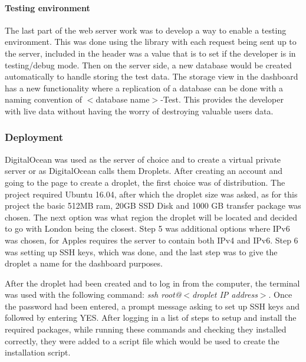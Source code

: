 

\paragraph{Testing environment}

The last part of the web server work was to develop a way to enable a testing environment. This was done using the library with each request being sent up to the server, included in the header was a value that is to set if the developer is in testing/debug mode. Then on the server side, a new database would be created automatically to handle storing the test data. The storage view in the dashboard has a new functionality where a replication of a database can be done with a naming convention of $<$database name$>$-Test. This provides the developer with live data without having the worry of destroying valuable users data.

\subsubsection{Deployment}

DigitalOcean was used as the server of choice and to create a virtual private server or as DigitalOcean calls them Droplets. After creating an account and going to the page to create a droplet, the first choice was of distribution. The project required Ubuntu 16.04, after which the droplet size was asked, as for this project the basic 512MB ram, 20GB SSD Disk and 1000 GB transfer package was chosen. The next option was what region the droplet will be located and decided to go with London being the closest. Step 5 was additional options where IPv6 was chosen, for Apples requires the server to contain both IPv4 and IPv6. Step 6 was setting up SSH keys, which was done, and the last step was to give the droplet a name for the dashboard purposes.

After the droplet had been created and to log in from the computer, the terminal was used with the following command: \textit{ssh root@$<$droplet IP address$>$}. Once the password had been entered, a prompt message asking to set up SSH keys and followed by entering YES. After logging in a list of steps to setup and install the required packages, while running these commands and checking they installed correctly, they were added to a script file which would be used to create the installation script.

